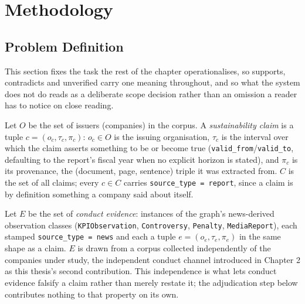 \documentclass[fontsize=12pt,oneside,headings=small]{scrreprt}
\begin{document}
\chapter{Methodology}
\label{ch:methodology}
\section{Problem Definition}
\label{sec:problem-definition}

This section fixes the task the rest of the chapter operationalises, so \textsf{supports}, \textsf{contradicts} and \textsf{unverified} carry one meaning throughout, and so what the system does not do reads as a deliberate scope decision rather than an omission a reader has to notice on close reading.

Let $O$ be the set of issuers (companies) in the corpus. A \emph{sustainability claim} is a tuple $c = (o_c, \tau_c, \pi_c)$: $o_c \in O$ is the issuing organisation, $\tau_c$ is the interval over which the claim asserts something to be or become true (\texttt{valid\_from}/\texttt{valid\_to}, defaulting to the report's fiscal year when no explicit horizon is stated), and $\pi_c$ is its provenance, the (document, page, sentence) triple it was extracted from. $C$ is the set of all claims; every $c \in C$ carries \texttt{source\_type = report}, since a claim is by definition something a company said about itself.

Let $E$ be the set of \emph{conduct evidence}: instances of the graph's news-derived observation classes (\texttt{KPIObservation}, \texttt{Controversy}, \texttt{Penalty}, \texttt{MediaReport}), each stamped \texttt{source\_type = news} and each a tuple $e = (o_e, \tau_e, \pi_e)$ in the same shape as a claim. $E$ is drawn from a corpus collected independently of the companies under study, the independent conduct channel introduced in Chapter 2 as this thesis's second contribution. This independence is what lets conduct evidence falsify a claim rather than merely restate it; the adjudication step below contributes nothing to that property on its own.
\end{document}

